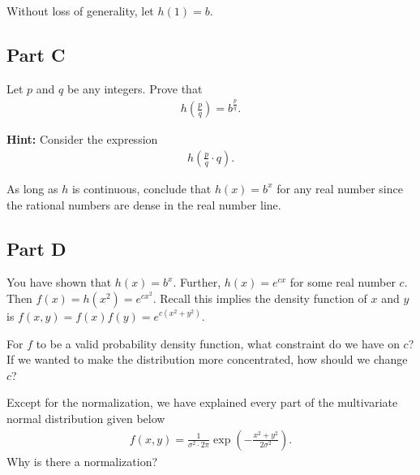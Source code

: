 \documentclass{article}
\begin{document}
Without loss of generality, let \(h(1) = b\).

\hypertarget{part-c}{%
\subsection*{Part C}\label{part-c}}

Let \(p\) and \(q\) be any integers. Prove that \begin{align*}
h\left(\frac{p}{q}\right) = b^{\frac{p}{q}}.
\end{align*}

\textbf{Hint:} Consider the expression \begin{align*}
h\left(\frac{p}{q} \cdot q \right).
\end{align*}

As long as \(h\) is continuous, conclude that \(h(x) = b^x\) for any real number since the rational numbers are dense in the real number line.

\hypertarget{part-d}{%
\subsection*{Part D}\label{part-d}}

You have shown that \(h(x) = b^x\). Further, \(h(x) = e^{cx}\) for some real number \(c\). Then \(f(x) = h(x^2) = e^{c x^2}\). Recall this implies the density function of \(x\) and \(y\) is \(f(x,y) = f(x) f(y) = e^{c (x^2 + y^2)}\).

For \(f\) to be a valid probability density function, what constraint do we have on \(c\)? If we wanted to make the distribution more concentrated, how should we change \(c\)?

Except for the normalization, we have explained every part of the multivariate normal distribution given below \begin{align*}
f(x,y) = \frac1{\sigma^2 \cdot 2 \pi} \exp\left(-\frac{x^2 + y^2}{2\sigma^2}\right).
\end{align*} Why is there a normalization?
\end{document}
